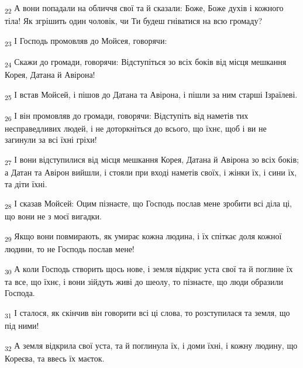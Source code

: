 \begin{tcolorbox}
\textsubscript{22} А вони попадали на обличчя свої та й сказали: Боже, Боже духів і кожного тіла! Як згрішить один чоловік, чи Ти будеш гніватися на всю громаду?
\end{tcolorbox}
\begin{tcolorbox}
\textsubscript{23} І Господь промовляв до Мойсея, говорячи:
\end{tcolorbox}
\begin{tcolorbox}
\textsubscript{24} Скажи до громади, говорячи: Відступіться зо всіх боків від місця мешкання Корея, Датана й Авірона!
\end{tcolorbox}
\begin{tcolorbox}
\textsubscript{25} І встав Мойсей, і пішов до Датана та Авірона, і пішли за ним старші Ізраїлеві.
\end{tcolorbox}
\begin{tcolorbox}
\textsubscript{26} І він промовляв до громади, говорячи: Відступіть від наметів тих несправедливих людей, і не доторкніться до всього, що їхнє, щоб і ви не загинули за всі їхні гріхи!
\end{tcolorbox}
\begin{tcolorbox}
\textsubscript{27} І вони відступилися від місця мешкання Корея, Датана й Авірона зо всіх боків; а Датан та Авірон вийшли, і стояли при вході наметів своїх, і жінки їх, і сини їх, та діти їхні.
\end{tcolorbox}
\begin{tcolorbox}
\textsubscript{28} І сказав Мойсей: Оцим пізнаєте, що Господь послав мене зробити всі діла ці, що вони не з моєї вигадки.
\end{tcolorbox}
\begin{tcolorbox}
\textsubscript{29} Якщо вони повмирають, як умирає кожна людина, і їх спіткає доля кожної людини, то не Господь послав мене!
\end{tcolorbox}
\begin{tcolorbox}
\textsubscript{30} А коли Господь створить щось нове, і земля відкриє уста свої та й поглине їх та все, що їхнє, і вони зійдуть живі до шеолу, то пізнаєте, що люди образили Господа.
\end{tcolorbox}
\begin{tcolorbox}
\textsubscript{31} І сталося, як скінчив він говорити всі ці слова, то розступилася та земля, що під ними!
\end{tcolorbox}
\begin{tcolorbox}
\textsubscript{32} А земля відкрила свої уста, та й поглинула їх, і доми їхні, і кожну людину, що Кореєва, та ввесь їх маєток.
\end{tcolorbox}
